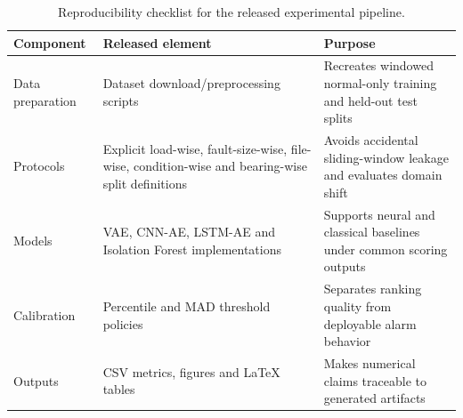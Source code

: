 \begin{table}[t]
\centering
\caption{Reproducibility checklist for the released experimental pipeline.}
\label{tab:reproducibility}
\small
\setlength{\tabcolsep}{5pt}
\renewcommand{\arraystretch}{1.12}
\begin{tabularx}{\textwidth}{>{\raggedright\arraybackslash}p{2.4cm}
>{\raggedright\arraybackslash}p{5.0cm}
>{\raggedright\arraybackslash}X}
\toprule
Component & Released element & Purpose \\
\midrule
Data preparation & Dataset download/preprocessing scripts & Recreates windowed normal-only training and held-out test splits \\
Protocols & Explicit load-wise, fault-size-wise, file-wise, condition-wise and bearing-wise split definitions & Avoids accidental sliding-window leakage and evaluates domain shift \\
Models & VAE, CNN-AE, LSTM-AE and Isolation Forest implementations & Supports neural and classical baselines under common scoring outputs \\
Calibration & Percentile and MAD threshold policies & Separates ranking quality from deployable alarm behavior \\
Outputs & CSV metrics, figures and LaTeX tables & Makes numerical claims traceable to generated artifacts \\
\bottomrule
\end{tabularx}
\end{table}
